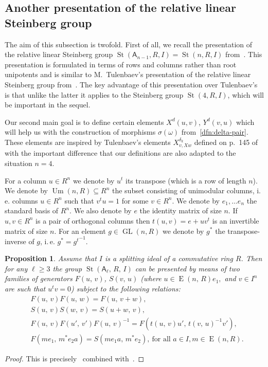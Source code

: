 \documentclass[oneside, 10pt]{amsart}
\DeclareMathOperator{\St}{St}
\DeclareMathOperator{\GL}{GL}
\DeclareMathOperator{\E}{E}
\DeclareMathOperator{\Um}{Um}
\newcommand{\rA}{\mathsf{A}}
\numberwithin{equation}{section}
\numberwithin{thm}{section}
\numberwithin{lemma}{section}
\newtheorem{prop}[lemma]{Proposition}
\theoremstyle{definition}
\theoremstyle{remark}
\begin{document}
\subsection{Another presentation of the relative linear Steinberg group} \label{subsec:rel-presentation}
The aim of this subsection is twofold.
First of all, we recall the presentation of the relative linear Steinberg group $\St(\rA_{n-1}, R, I) = \St(n, R, I)$ from~\cite{LS17}.
This presentation is formulated in terms of rows and columns rather than root unipotents and is similar to
M.~Tulenbaev's presentation of the relative linear Steinberg group from~\cite[Definition~1.5]{Tu83}.
The key advantage of this presentation over Tulenbaev's is that unlike the latter it applies to the Steinberg group $\St(4, R, I)$,
which will be important in the sequel.

Our second main goal is to define certain elements $X^d(u, v)$, $Y^d(v, u)$ which will help us
with the construction of morphisms $\sigma(\omega)$ from~\cref{dfn:delta-pair}.
These elements are inspired by Tulenbaev's elements $X_{v, Xw}^{\delta_k}$ defined on p.~145 of~\cite{Tu83} with
the important difference that our definitions are also adapted to the situation $n=4$.

For a column $u \in R^n$ we denote by $u^t$ its transpose (which is a row of length $n$).
We denote by $\Um(n, R) \subseteq R^n$ the subset consisting of unimodular columns,
i.\,e. columns $u \in R^n$ such that $v^t u = 1$ for some $v \in R^n$.
We denote by $e_1, \ldots e_n$ the standard basis of $R^n$.
We also denote by $e$ the identity matrix of size $n$.
If $u, v \in R^n$ is a pair of orthogonal columns then $t(u, v) = e + uv^t$ is an invertible matrix of size $n.$
For an element $g \in \GL(n, R)$ we denote by $g^*$ the transpose-inverse of $g$, i.\,e. $g^* = {g^{t}}^{-1}.$

\begin{prop}
\label{prop:rel-presentation}
Assume that $I$ is a splitting ideal of a commutative ring $R$.
Then for any $\ell\geq 3$ the group $\St(\rA_\ell,\,R,\,I)$ can be presented by means of two families of generators $F(u,\,v)$, $S(v,\,u)$
(where $u\in \E(n,\,R)e_1,$ and $v\in I^n$ are such that $u^{t}v=0$) subject to the following relations:
\begin{align}
&F(u,\,v)F(u,\,w)=F(u,\,v+w), \label{add4}\\
&S(u,\,v)S(w,\,v)=S(u+w,\,v), \label{add5}\\
&F(u,\,v)F(u',\,v')F(u,\,v)^{-1}=F(t(u,\,v)u',\,t(v,\,u)^{-1} v'), \label{conj3} \\
&F(me_1,\,m^{*}e_{2}a)=S(me_{1}a,\,m^{*}e_{2}),\ \text{for all $a\in I$,}\, m \in \E(n, R). \label{coef-move}
\end{align}
\end{prop}
\begin{proof}
This is precisely~\cite[Proposition 3.10]{LS17} combined with~\cite[Proposition~8]{S15}.
\end{proof}
\end{document}

